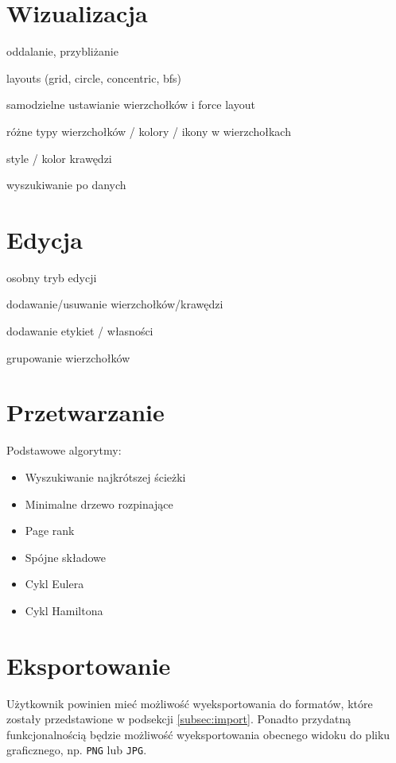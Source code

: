 \section{Wizualizacja}

oddalanie, przybliżanie

layouts (grid, circle, concentric, bfs)

samodzielne ustawianie wierzchołków i force layout

różne typy wierzchołków / kolory / ikony w wierzchołkach

style / kolor krawędzi

wyszukiwanie po danych

\section{Edycja}

osobny tryb edycji

dodawanie/usuwanie wierzchołków/krawędzi

dodawanie etykiet / własności

grupowanie wierzchołków


\section{Przetwarzanie}

Podstawowe algorytmy:

\begin{itemize}
\setlength\itemsep{0em}
\item Wyszukiwanie najkrótszej ścieżki
\item Minimalne drzewo rozpinające
\item Page rank
\item Spójne składowe
\item Cykl Eulera
\item Cykl Hamiltona
\end{itemize}

\section{Eksportowanie}
Użytkownik powinien mieć możliwość wyeksportowania do formatów, które zostały przedstawione w podsekcji \ref{subsec:import}. Ponadto przydatną funkcjonalnością będzie możliwość wyeksportowania obecnego widoku do pliku graficznego, np. \texttt{PNG} lub \texttt{JPG}. 